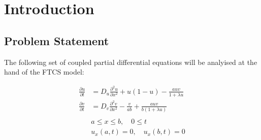 \section{Introduction}

\subsection{Problem Statement}

The following set of coupled partial differential equations will be
analyised at the hand of the FTCS model:

\begin{align*}
\frac{\partial u}{\partial t} &= D_u \frac{\partial^2 u}{\partial x^2} +
                                 u(1 - u) - \frac{auv}{1+\lambda u} \\
\frac{\partial v}{\partial t} &= D_v \frac{\partial^2 v}{\partial x^2} -
                                 \frac{v}{ab} + \frac{auv}{b(1+\lambda u)} \\
                                 \\
                              & a \leq x \leq b, \quad 0 \leq t \\
                              & u_x(a,t) = 0, \quad u_x(b,t) = 0
\end{align*}
